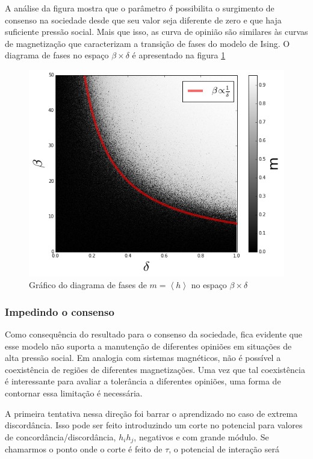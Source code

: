 \documentclass[11pt]{article}
\begin{document}
A análise da figura mostra que o parâmetro $\delta$ possibilita o surgimento de
consenso na sociedade desde que seu valor seja diferente de zero e que haja
suficiente pressão social. Mais que isso, as curva de opinião são similares às
curvas de magnetização que caracterizam a transição de fases do modelo de Ising.
O diagrama de fases no espaço $\beta \times \delta$ é apresentado na figura
\ref{m-pd} 

\begin{figure}[h!]
  \centering
      \includegraphics[width=1.0\textwidth]{mag-phase-diagram-greyscale.png}
  \caption{Gráfico do diagrama de fases de $m=\left<h\right>$ no espaço 
  $\beta \times \delta$}
  \label{m-pd}
\end{figure}

\subsubsection{Impedindo o consenso}

Como consequência do resultado para o consenso da sociedade, fica evidente que
esse modelo não suporta a manutenção de diferentes opiniões em situações de alta
pressão social. Em analogia com sistemas magnéticos, não é possível a
coexistência de regiões de diferentes magnetizações. Uma vez que tal coexistência
é interessante para avaliar a tolerância a
diferentes opiniões, uma forma de contornar essa limitação é necessária. 

A primeira tentativa nessa direção foi barrar o aprendizado no caso de extrema
discordância. Isso pode ser feito introduzindo um corte no potencial para
valores de concordância/discordância, $h_i h_j$, negativos e com grande módulo.
Se chamarmos o
ponto onde o corte é feito de $\tau$, o potencial de interação será
\end{document}

